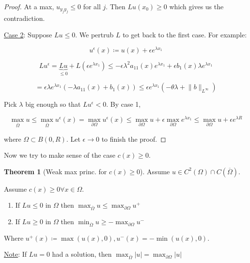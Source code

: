 \documentclass{article}
\theoremstyle{definition}
\newtheorem{theorem}{Theorem}
\begin{document}
\begin{proof}
    At a max, \(u_{y_j y_j} \leq 0\) for all \(j\). Then \(Lu(x_0) \geq 0\) which gives us the contradiction.

    \underline{Case 2}: Suppose \(Lu \leq 0\). We pertrub \(L\) to get back to the first case. For example:

    \[
        u^{\epsilon} (x) \coloneqq u(x) + \epsilon e^{\lambda x_1}
    \]

    \[
        L u^{\epsilon} = \underbrace{Lu}_{\leq 0} + L(\epsilon e^{\lambda x_1}) \leq - \epsilon \lambda^2 a_{11} (x) e^{\lambda x_1}+\epsilon b_1(x)\lambda e^{\lambda x_1}
    \]

    \[
        = \epsilon \lambda e^{\lambda x_1} (-\lambda a_{11} (x) + b_1(x)) \leq \epsilon e^{\lambda x_1}(-\theta \lambda + \lVert b \rVert _{L^{\infty}})
    \]

    Pick \(\lambda\) big enough so that \(L u^{\epsilon} < 0\). By case 1,
    
    \[
        \max_{\overline{\Omega}} u \leq  \max_{\overline{\Omega}}u^{\epsilon} (x) = \max_{\partial \Omega} u^{\epsilon} (x) \leq \max_{\partial \Omega} u + \epsilon \max_{\partial \Omega} e^{\lambda x_1} \leq \max_{\partial \Omega} u + \epsilon e^{\lambda R}
    \]

    where \(\Omega \subset B(0,R)\). Let \(\epsilon \to 0\) to finish the proof.

\end{proof}

Now we try to make sense of the case \(c(x) \geq 0\).

\begin{theorem}
    [Weak max princ. for \(c(x)\geq 0\)]

    Assume \(u\in C^2(\Omega)\cap C(\overline{\Omega})\).

    Assume \(c(x) \geq 0 \forall x\in \Omega\).

    \begin{enumerate}[label=\roman*)]
        \item If \(Lu \leq 0\) in \(\Omega\) then \(\max_{\overline{\Omega}} u \leq \max_{\partial \Omega} u^+\)
        \item If \(Lu \geq 0\) in \(\Omega\) then \(\min_{\overline{\Omega}}u \geq - \max_{\partial \Omega}u^-\)   
    \end{enumerate} 

    Where \(u^+(x) \coloneqq \max (u(x),0), u^-(x) = -\min (u(x),0)\).
\end{theorem}

\underline{Note}: If \(Lu = 0\) had a solution, then \(\max_{\overline{\Omega}} \vert u \vert = \max_{\partial \Omega} \vert u \vert \) 
\end{document}
